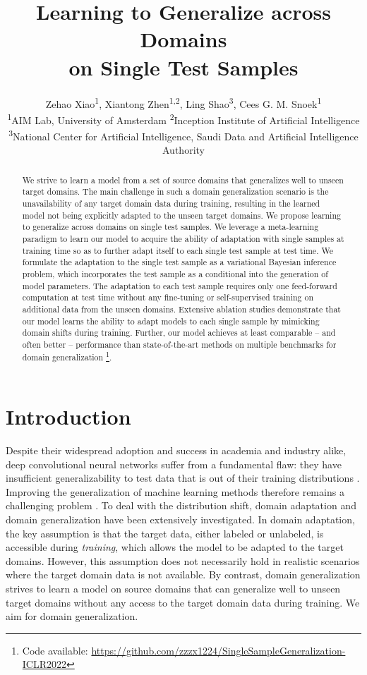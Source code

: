 \documentclass{article} \usepackage[table]{xcolor}
\title{Learning to Generalize across Domains \\ on Single Test Samples}
\author{
Zehao Xiao\textsuperscript{1},
Xiantong Zhen\textsuperscript{1,2},
Ling Shao\textsuperscript{3},
Cees G. M. Snoek\textsuperscript{1} \\
\textsuperscript{1}AIM Lab, University of Amsterdam \textsuperscript{2}Inception Institute of Artificial Intelligence \\ \textsuperscript{3}National Center for Artificial Intelligence, Saudi Data and Artificial Intelligence Authority}
\begin{document}
\maketitle

\begin{abstract} 
We strive to learn a model from a set of source domains that generalizes well to unseen target domains. The main challenge in such a domain generalization scenario is the unavailability of any target domain data during training, resulting in the learned model not being explicitly adapted to the unseen target domains. 
We propose learning to generalize across domains on single test samples. 
We leverage a meta-learning paradigm to learn our model to acquire the ability of adaptation with single samples at training time so as to further adapt itself to each single test sample at test time. 
We formulate the adaptation to the single test sample as a variational Bayesian inference problem, which incorporates the test sample as a conditional into the generation of model parameters. 
The adaptation to each test sample requires only one feed-forward computation at test time without any fine-tuning or self-supervised training on additional data from the unseen domains. 
Extensive ablation studies demonstrate that our model learns the ability to adapt models to each single sample by mimicking domain shifts during training. 
Further, our model achieves at least comparable -- and often better -- performance than state-of-the-art methods on multiple benchmarks for domain generalization
\footnote{Code available: \url{https://github.com/zzzx1224/SingleSampleGeneralization-ICLR2022}}.
\end{abstract}

\section{Introduction}



Despite their widespread adoption and success in academia and industry alike, deep convolutional neural networks suffer from a fundamental flaw: they have insufficient generalizability to test data that is out of their training distributions \citep{recht2019imagenet}.
Improving the generalization of machine learning methods therefore remains a challenging problem  \citep{moreno2012unifying,recht2019imagenet,krueger2021out}.
To deal with the distribution shift, domain adaptation \citep{saenko2010adapting,long2015learning,lu2020stochastic,li2021learning} and domain generalization  \citep{muandet2013domain,li2017deeper,li2020domain} have been extensively investigated.
In domain adaptation, the key assumption is that the target data, either labeled or unlabeled, is accessible during \textit{training}, which allows the model to be adapted to the target domains. 
However, this assumption does not necessarily hold in realistic scenarios where the target domain data is not available.
By contrast, domain generalization strives to learn a model on source domains that can generalize well to unseen target domains without any access to the target domain data during training. We aim for domain generalization.
\end{document}
